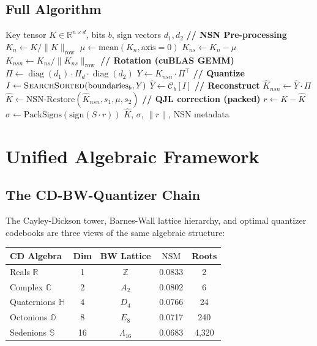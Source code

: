 \documentclass[sigconf,anonymous,review]{acmart}
\DeclareMathOperator{\diag}{diag}
\DeclareMathOperator{\NSM}{NSM}
\newcommand{\R}{\mathbb{R}}
\newcommand{\C}{\mathbb{C}}
\newcommand{\HH}{\mathbb{H}}
\newcommand{\OO}{\mathbb{O}}
\newcommand{\norm}[1]{\lVert #1 \rVert}
\begin{document}
\subsection{Full Algorithm}

\begin{algorithm}[t]
\caption{Extended TurboQuant Pipeline}
\label{alg:pipeline}
\begin{algorithmic}[1]
\REQUIRE Key tensor $K \in \R^{n \times d}$, bits $b$, sign vectors $d_1, d_2$
\STATE \textbf{// NSN Pre-processing}
\STATE $K_n \gets K / \norm{K}_{\mathrm{row}}$ 
\STATE $\mu \gets \mathrm{mean}(K_n, \mathrm{axis}{=}0)$ 
\STATE $K_{ns} \gets K_n - \mu$ 
\STATE $K_{nsn} \gets K_{ns} / \norm{K_{ns}}_{\mathrm{row}}$ 
\STATE \textbf{// Rotation (cuBLAS GEMM)}
\STATE $\Pi \gets \diag(d_1) \cdot H_d \cdot \diag(d_2)$ 
\STATE $Y \gets K_{nsn} \cdot \Pi^\top$ 
\STATE \textbf{// Quantize}
\STATE $I \gets \textsc{SearchSorted}(\mathrm{boundaries}_b, Y)$
\STATE $\hat{Y} \gets \mathcal{C}_b[I]$ 
\STATE \textbf{// Reconstruct}
\STATE $\hat{K}_{nsn} \gets \hat{Y} \cdot \Pi$
\STATE $\hat{K} \gets \mathrm{NSN\text{-}Restore}(\hat{K}_{nsn}, s_1, \mu, s_2)$
\STATE \textbf{// QJL correction (packed)}
\STATE $r \gets K - \hat{K}$
\STATE $\sigma \gets \mathrm{PackSigns}(\mathrm{sign}(S \cdot r))$
\RETURN $\hat{K}$, $\sigma$, $\norm{r}$, NSN metadata
\end{algorithmic}
\end{algorithm}

\section{Unified Algebraic Framework}
\label{sec:algebra}

\subsection{The CD-BW-Quantizer Chain}

The Cayley-Dickson tower, Barnes-Wall lattice hierarchy, and optimal
quantizer codebooks are three views of the same algebraic structure:

\begin{center}
\begin{tabular}{lcccc}
\toprule
CD Algebra & Dim & BW Lattice & $\NSM$ & Roots \\
\midrule
Reals $\R$ & 1 & $\mathbb{Z}$ & 0.0833 & 2 \\
Complex $\C$ & 2 & $A_2$ & 0.0802 & 6 \\
Quaternions $\HH$ & 4 & $D_4$ & 0.0766 & 24 \\
Octonions $\OO$ & 8 & $E_8$ & 0.0717 & 240 \\
Sedenions $\mathbb{S}$ & 16 & $\Lambda_{16}$ & 0.0683 & 4{,}320 \\
\bottomrule
\end{tabular}
\end{center}
\end{document}
